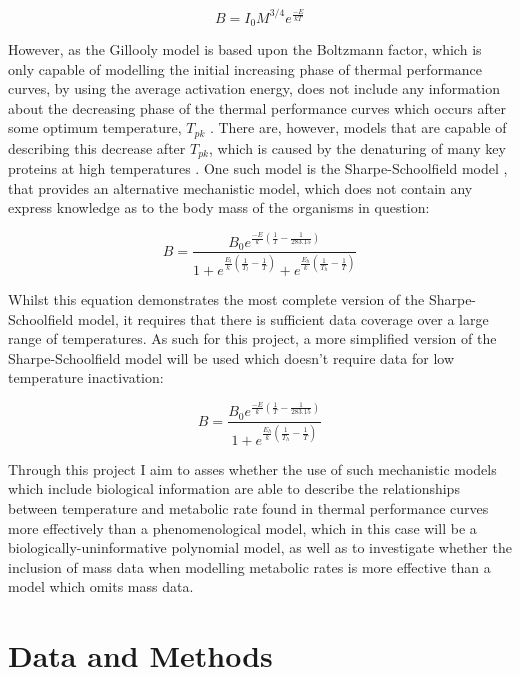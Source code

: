 \documentclass[11pt]{article}
\begin{document}
\begin{linenumbers}
\begin{equation}
    B = I_{0}M^{3/4}e^{\frac{-E}{kT}}
\end{equation}

However, as the Gillooly model is based upon the Boltzmann factor, which is only capable of modelling the initial increasing phase of thermal performance curves, by using the average activation energy, does not include any information about the decreasing phase of the thermal performance curves which occurs after some optimum temperature, \textit{$T_{pk}$} \citep{Schoolfield1981, Brown2004}. There are, however, models that are capable of describing this decrease after \textit{$T_{pk}$}, which is caused by the denaturing of many key proteins at high temperatures \citep{Sharpe1977, Schoolfield1981}. One such model is the Sharpe-Schoolfield model \citep{Schoolfield1981}, that provides an alternative mechanistic model, which does not contain any express knowledge as to the body mass of the organisms in question:

\begin{equation}
    B = \frac{B_{0}e^{\frac{-E}{k}(\frac{1}{T} - \frac{1}{283.15})}}{1 + e^{\frac{E_l}{k}(\frac{1}{T_l}-\frac{1}{T})} + e^{\frac{E_h}{k}(\frac{1}{T_h}-\frac{1}{T})}}
\end{equation}

Whilst this equation demonstrates the most complete version of the Sharpe-Schoolfield model, it requires that there is sufficient data coverage over a large range of temperatures. As such for this project, a more simplified version of the Sharpe-Schoolfield model will be used which doesn't require data for low temperature inactivation:

\begin{equation}
    B = \frac{B_{0}e^{\frac{-E}{k}(\frac{1}{T} - \frac{1}{283.15})}}{1 + e^{\frac{E_h}{k}(\frac{1}{T_h}-\frac{1}{T})}}
\end{equation}

Through this project I aim to asses whether the use of such mechanistic models which include biological information are able to describe the relationships between temperature and metabolic rate found in thermal performance curves more effectively than a phenomenological model, which in this case will be a biologically-uninformative polynomial model, as well as to investigate whether the inclusion of mass data when modelling metabolic rates is more effective than a model which omits mass data.

\section{Data and Methods}

\end{linenumbers}
\end{document}
